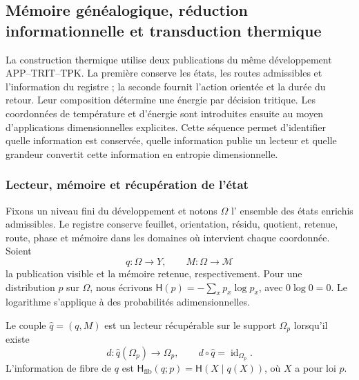 
\subsection{Mémoire généalogique, réduction informationnelle et transduction thermique}
\label{ii:sec:ii-kb-aut-desarrollo}

La construction thermique utilise deux publications du même développement APP--TRIT--TPK. La première conserve les états, les routes admissibles et l'information du registre ; la seconde fournit l'action orientée et la durée du retour. Leur composition détermine une énergie par décision tritique. Les coordonnées de température et d'énergie sont introduites ensuite au moyen d'applications dimensionnelles explicites. Cette séquence permet d'identifier quelle information est conservée, quelle information publie un lecteur et quelle grandeur convertit cette information en entropie dimensionnelle.

\subsubsection{Lecteur, mémoire et récupération de l'état}

Fixons un niveau fini du développement et notons \(\Omega\) l'
ensemble des états enrichis admissibles. Le registre conserve feuillet,
orientation, résidu, quotient, retenue, route, phase et mémoire dans les
domaines où intervient chaque coordonnée. Soient
\[
 q:\Omega\longrightarrow Y,\qquad
 M:\Omega\longrightarrow\mathcal M
\]
la publication visible et la mémoire retenue, respectivement. Pour une
distribution \(p\) sur \(\Omega\), nous écrivons
\(\mathsf H(p)=-\sum_xp_x\log p_x\), avec \(0\log0=0\).
Le logarithme s'applique à des probabilités adimensionnelles.

\begin{definition}
Le couple \(\widehat q=(q,M)\) est un lecteur récupérable sur le support
\(\Omega_p\) lorsqu'il existe
\[
 d:\widehat q(\Omega_p)\longrightarrow\Omega_p,
 \qquad d\circ\widehat q=\operatorname{id}_{\Omega_p}.
\]
L'information de fibre de \(q\) est
\(\mathsf H_{\mathrm{fib}}(q;p)=\mathsf H(X\mid q(X))\), où
\(X\) a pour loi \(p\).
\end{definition}

